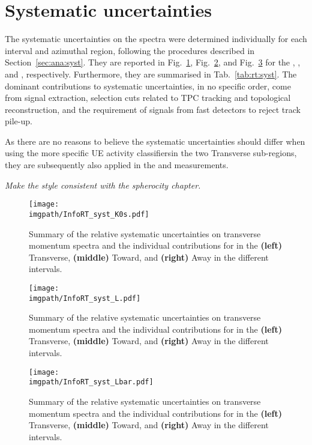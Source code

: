 \section{Systematic uncertainties}

The systematic uncertainties on the \pt spectra were determined individually for each \RT interval and azimuthal region, following the procedures described in Section~\ref{sec:ana:syst}. They are reported in Fig.~\ref{fig:rt:systK0s}, Fig.~\ref{fig:rt:systLA}, and Fig.~\ref{fig:rt:systAL} for the \KOs, \LA, and \AL, respectively. Furthermore, they are summarised in Tab.~\ref{tab:rt:syst}. The dominant contributions to systematic uncertainties, in no specific order, come from signal extraction, selection cuts related to TPC tracking and topological reconstruction, and the requirement of signals from fast detectors to reject track pile-up.

As there are no reasons to believe the systematic uncertainties should differ when using the more specific UE activity classifiersin the two Transverse sub-regions, they are subsequently also applied in the \RTmin and \RTmax measurements.

\textit{Make the style consistent with the spherocity chapter.}

\begin{figure}[H]%
\texttt{[image: \\imgpath/InfoRT\_syst\_K0s.pdf]}\\
\caption{Summary of the relative systematic uncertainties on transverse momentum spectra and the individual contributions for \KOs in the \textbf{(left)} Transverse, \textbf{(middle)} Toward, and \textbf{(right)} Away in the different \RT intervals.}
\label{fig:rt:systK0s}
\end{figure}

\begin{figure}[H]%
\texttt{[image: \\imgpath/InfoRT\_syst\_L.pdf]}\\
\caption{Summary of the relative systematic uncertainties on transverse momentum spectra and the individual contributions for \LA in the \textbf{(left)} Transverse, \textbf{(middle)} Toward, and \textbf{(right)} Away in the different \RT intervals.}
\label{fig:rt:systLA}
\end{figure}

\begin{figure}[H]%
\texttt{[image: \\imgpath/InfoRT\_syst\_Lbar.pdf]}\\
\caption{Summary of the relative systematic uncertainties on transverse momentum spectra and the individual contributions for \AL in the \textbf{(left)} Transverse, \textbf{(middle)} Toward, and \textbf{(right)} Away in the different \RT intervals.}
\label{fig:rt:systAL}
\end{figure}

